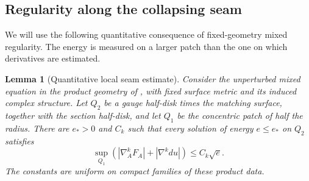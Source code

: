 \documentclass[11pt]{amsart}
\newtheorem{lemma}[theorem]{Lemma}
\theoremstyle{definition}
\theoremstyle{remark}
\theoremstyle{plain}
\numberwithin{equation}{section}
\begin{document}
\subsection{Regularity along the collapsing seam}\label{subsec:seam-regularity}

We will use the following quantitative consequence of fixed-geometry
mixed regularity. The energy is measured on a larger patch than
the one on which derivatives are estimated.

\begin{lemma}[Quantitative local seam estimate]\label{lem:quantitative-seam}
Consider the unperturbed mixed equation in the product geometry of
\cite[(1.1)]{DFL-mixed}, with fixed surface metric and its induced
complex structure. Let $Q_2$ be a gauge half-disk times the matching
surface, together with the section half-disk, and let $Q_1$ be the
concentric patch of half the radius. There are $e_*>0$ and $C_k$
such that every solution of energy $e\le e_*$ on $Q_2$ satisfies
\[
 \sup_{Q_1}(|\nabla_A^kF_A|+|\nabla^kdu|)\le C_k\sqrt e.
\]
The constants are uniform on compact families of these product data.
\end{lemma}
\end{document}
